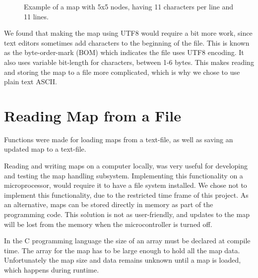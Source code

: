 {\begin{figure}[htp]
{    }
    \hspace{0.2\textwidth}
    \caption{Example of a map with 5x5 nodes, having 11 characters per line and 11 lines.}
    \label{fig:5x5map}
\end{figure}

We found that making the map using UTF8 would require a bit more work, 
since text editors sometimes add characters to the beginning of the file. 
This is known as the byte-order-mark (BOM) which indicates the file uses UTF8 encoding. 
It also uses variable bit-length for characters, between 1-6 bytes.
This makes reading and storing the map to a file more complicated, which is why we chose to use plain text ASCII.

\newpage
\section{Reading Map from a File}
\label{sec:map_read} %
Functions were made for loading maps from a text-file, as well as saving an updated map to a text-file. 

Reading and writing maps on a computer locally, was very useful for developing and testing the map handling subsystem. 
Implementing this functionality on a microprocessor, would require it to have a file system installed.
We chose not to implement this functionality, due to the restricted time frame of this project.
As an alternative, maps can be stored directly in memory as part of the programming code. 
This solution is not as user-friendly, and updates to the map will be lost from the memory when the microcontroller is turned off.

In the C programming language the size of an array must be declared at compile time. 
The array for the map has to be large enough to hold all the map data.
Unfortunately the map size and data remains unknown until a map is loaded, which happens during runtime.

}
